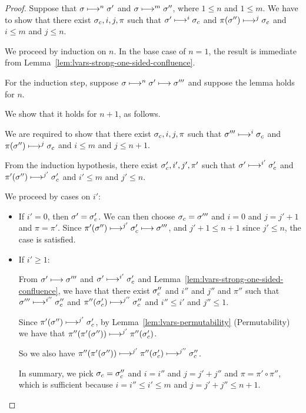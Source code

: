 \begin{proof}
  Suppose that $\sigma \longmapsto^n \sigma'$ and $\sigma \longmapsto^m
  \sigma''$, where $1 \leq n$ and $1 \leq m$.  We have to show that
  there exist $\sigma_c, i, j, \pi$ such that $\sigma' \longmapsto^i
  \sigma_c$ and $\pi(\sigma'') \longmapsto^j \sigma_c$ and $i \leq m$ and
  $j \leq n$.

  We proceed by induction on $n$.  In the base case of $n = 1$, the
  result is immediate from
  Lemma~\ref{lem:lvars-strong-one-sided-confluence}.

  For the induction step, suppose $\sigma \longmapsto^n \sigma'
  \longmapsto \sigma'''$ and suppose the lemma holds for $n$.

  We show that it holds for $n + 1$, as follows.

  We are required to show that there exist $\sigma_c, i, j, \pi$ such
  that $\sigma''' \longmapsto^i \sigma_c$ and $\pi(\sigma'')
  \longmapsto^j \sigma_c$ and $i \leq m$ and $j \leq n + 1$.

  From the induction hypothesis, there exist $\sigma'_c, i', j', \pi'$
  such that $\sigma' \longmapsto^{i'} \sigma'_c$ and $\pi'(\sigma'')
  \longmapsto^{j'} \sigma'_c$ and $i' \leq m$ and $j' \leq n$.

  We proceed by cases on $i'$:
  \begin{itemize}

  \item If $i' = 0$, then $\sigma' = \sigma_c'$.  We can then choose
    $\sigma_c = \sigma'''$ and $i = 0$ and $j = j' + 1$ and $\pi =
    \pi'$.  Since $\pi'(\sigma'') \longmapsto^{j'} \sigma'_c \longmapsto
    \sigma'''$, and $j' + 1 \leq n + 1$ since $j' \leq n$, the case is
    satisfied.

  \item If $i' \geq 1$:

    From $\sigma' \longmapsto \sigma'''$ and $\sigma' \longmapsto^{i'}
    \sigma_c'$ and Lemma~\ref{lem:lvars-strong-one-sided-confluence},
    we have that there exist $\sigma_c''$ and $i''$ and $j''$ and
    $\pi''$ such that $\sigma''' \longmapsto^{i''} \sigma_c''$ and
    $\pi''(\sigma_c') \longmapsto^{j''} \sigma_c''$ and $i'' \leq i'$
    and $j'' \leq 1$.

    Since $\pi'(\sigma'') \longmapsto^{j'} \sigma'_c$, by
    Lemma~\ref{lem:lvars-permutability} (Permutability) we have that
    $\pi''(\pi'(\sigma'')) \longmapsto^{j'} \pi''(\sigma'_c)$.

    So we also have $\pi''(\pi'(\sigma'')) \longmapsto^{j'}
    \pi''(\sigma'_c) \longmapsto^{j''} \sigma_c''$.

    In summary, we pick $\sigma_c = \sigma_c''$ and $i = i''$ and $j =
    j' + j''$ and $\pi = \pi' \circ \pi''$, which is sufficient
    because $i = i'' \leq i' \leq m$ and $j = j' + j'' \leq n + 1$.
  \end{itemize}

\end{proof}
